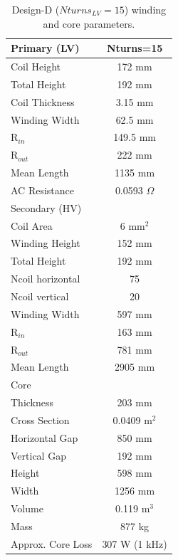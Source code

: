 \documentclass[a4paper, 11pt]{article} %
\begin{document}
\begin{table}[]
\begin{center}
\begin{tabular}{lc}
Primary (LV) & Nturns=15\\
\hline
Coil Height & 172 mm \\
Total Height & 192 mm \\
Coil Thickness & 3.15 mm\\
Winding Width & 62.5 mm \\
R$_{in}$ & 149.5 mm \\
R$_{out}$ & 222 mm \\
Mean Length & 1135 mm \\
AC Resistance & 0.0593 $\Omega$ \\
\hline
Secondary (HV) \\
Coil Area & 6 mm$^2$\\
Winding Height & 152 mm \\ 
Total Height & 192 mm \\
Ncoil horizontal & 75 \\
Ncoil vertical & 20 \\
Winding Width & 597 mm \\
R$_{in}$ & 163 mm \\
R$_{out}$ & 781 mm \\
Mean Length & 2905 mm \\
\hline
Core \\
Thickness & 203 mm \\
Cross Section & 0.0409 m$^2$\\
Horizontal Gap & 850 mm \\
Vertical Gap & 192 mm \\
Height & 598 mm \\
Width & 1256 mm \\
Volume & 0.119 m$^3$ \\
Mass & 877 kg \\
\hline
Approx. Core Loss & 307 W (1 kHz) \\
\hline
\end{tabular} 
\end{center}
\caption{Design-D ($Nturns_{LV}=15$) winding and core parameters.}
\label{design_D}
\end{table}
\end{document}
